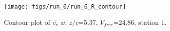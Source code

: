 \begin{figure}[H]
\centering
\texttt{[image: figs/run\_6/run\_6\_R\_contour]}
\caption{Contour plot of $\overline{v_{r}}$ at $z/c$=5.37, $V_{free}$=24.86, station 1.}
\label{fig:run_6_R_contour}
\end{figure}


